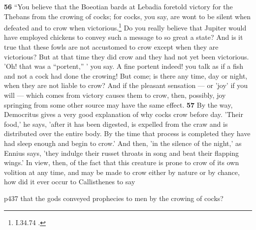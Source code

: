 \textbf{56} ``You believe that the Boeotian bards at Lebadia foretold victory for the Thebans from the crowing of cocks; for cocks, you say, are wont to be silent when defeated and to crow when victorious.\texthebrew{}\footnote{I.34.74 .

} Do you really believe that Jupiter would have employed chickens to convey such a message to so great a state? And is it true that these fowls are not accustomed to crow except when they are victorious? But at that time they did crow and they had not yet been victorious. 'Oh! that was a ``portent,'' ' you say. A fine portent indeed! you talk as if a fish and not a cock had done the crowing! But come; is there any time, day or night, when they are not liable to crow? And if the pleasant sensation \texthebrew{—} or 'joy' if you will \texthebrew{—} which comes from victory causes them to crow, then, possibly, joy springing from some other source may have the same effect. \textbf{57} By the way, Democritus gives a very good explanation of why cocks crow before day. 'Their food,' he says, 'after it has been digested, is expelled from the craw and is distributed over the entire body. By the time that process is completed they have had sleep enough and begin to crow.' And then, 'in the silence of the night,' as Ennius says, 'they indulge their russet throats in song and beat their flapping wings.' In view, then, of the fact that this creature is prone to crow of its own volition at any time, and may be made to crow either by nature or by chance, how did it ever occur to Callisthenes to say

p437 that the gods conveyed prophecies to men by the crowing of cocks?

